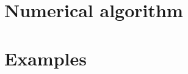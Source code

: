 \documentclass{article}
\numberwithin{equation}{section}
\theoremstyle{definition}
\begin{document}
\section{Numerical algorithm}





\section{Examples}






\printbibliography{}
\end{document}
